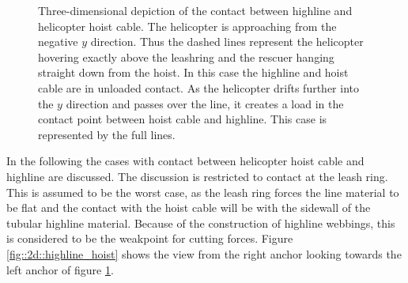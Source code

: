 \documentclass[a4paper,10pt]{scrartcl}
\begin{document}
\begin{figure}[ht]
\caption{Three-dimensional depiction of the contact between highline and helicopter hoist cable. The helicopter is approaching from the negative $y$ direction. Thus the dashed lines represent the helicopter hovering exactly above the leashring and the rescuer hanging straight down from the hoist. In this case the highline and hoist cable are in unloaded contact. As the helicopter drifts further into the $y$ direction and passes over the line, it creates a load in the contact point between hoist cable and highline. This case is represented by the full lines.}
\label{fig::3d::heli}
\end{figure}

In the following the cases with contact between helicopter hoist cable and highline are discussed. The discussion is restricted to contact at the leash ring. This is assumed to be the worst case, as the leash ring forces the line material to be flat and the contact with the hoist cable will be with the sidewall of the tubular highline material. Because of the construction of highline webbings, this is considered to be the weakpoint for cutting forces.
Figure \ref{fig::2d::highline_hoist} shows the view from the right anchor looking towards the left anchor of figure \ref{fig::3d::heli}.
\end{document}
